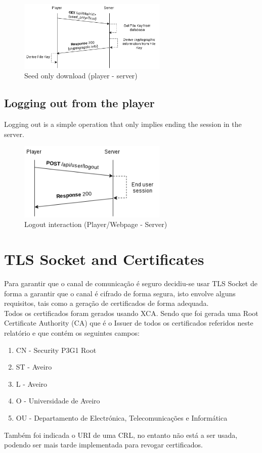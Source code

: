 \documentclass[11pt,a4paper]{report}
\begin{document}
\begin{figure}[H]
\centerline{\includegraphics[width=200pt]{images/seedOnlyDown.png}}
\caption{Seed only download (player - server)}
\label{player}
\end{figure}

\section{Logging out from the player}
Logging out is a simple operation that only implies ending the session in the server.

\begin{figure}[H]
\centerline{\includegraphics[width=200pt]{images/logout.png}}
\caption{Logout interaction (Player/Webpage - Server)}
\label{player}
\end{figure}

\chapter{TLS Socket and Certificates}
\label{sec:certs}
Para garantir que o canal de comunicação é seguro decidiu-se usar TLS Socket de forma a garantir que o canal é cifrado de forma segura, isto envolve alguns requisitos, tais como a geração de certificados de forma adequada.\\

Todos os certificados foram gerados usando XCA.
Sendo que foi gerada uma Root Certificate Authority (CA) que é o Issuer de todos os certificados referidos neste relatório e que contém os seguintes campos:
\begin{enumerate}
\item CN - Security P3G1 Root
\item ST - Aveiro
\item L - Aveiro
\item O - Universidade de Aveiro
\item OU - Departamento de Electrónica, Telecomunicações e Informática
\end{enumerate}
Também foi indicada o URI de uma CRL, no entanto não está a ser usada, podendo ser mais tarde implementada para revogar certificados.
\end{document}
